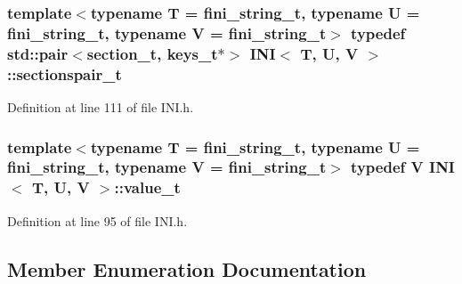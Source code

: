 \subsubsection[{sectionspair\+\_\+t}]{\setlength{\rightskip}{0pt plus 5cm}template$<$typename T = fini\+\_\+string\+\_\+t, typename U = fini\+\_\+string\+\_\+t, typename V = fini\+\_\+string\+\_\+t$>$ typedef std\+::pair$<${\bf section\+\_\+t}, {\bf keys\+\_\+t}$\ast$$>$ {\bf I\+N\+I}$<$ T, U, V $>$\+::{\bf sectionspair\+\_\+t}}\label{class_i_n_i_a87b850df48a4bf8c792df26927dec359}


Definition at line 111 of file I\+N\+I.\+h.

\hypertarget{class_i_n_i_aeda858880798b4d54ba09bbd00ee1683}{}
\subsubsection[{value\+\_\+t}]{\setlength{\rightskip}{0pt plus 5cm}template$<$typename T = fini\+\_\+string\+\_\+t, typename U = fini\+\_\+string\+\_\+t, typename V = fini\+\_\+string\+\_\+t$>$ typedef V {\bf I\+N\+I}$<$ T, U, V $>$\+::{\bf value\+\_\+t}}\label{class_i_n_i_aeda858880798b4d54ba09bbd00ee1683}


Definition at line 95 of file I\+N\+I.\+h.



\subsection{Member Enumeration Documentation}
\hypertarget{class_i_n_i_a0e7d70a0276fc704cdd427c9b02f7a03}{}

